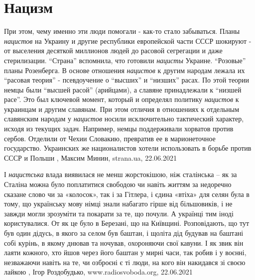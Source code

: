  
 
 
 
 
\chapter{Нацизм}
\label{sec:slova.nacizm}

При этом, чему именно эти люди помогали - как-то стало забываться. Планы
\emph{нацистов} на Украину и другие республики европейской части СССР шокируют - от
выселения десяткой миллионов людей до расовой сегрегации и даже стерилизации.
\enquote{Страна} вспомнила, что готовили \emph{нацисты} Украине.  \enquote{Розовые}
планы Розенберга.  В основе отношения \emph{нацистов} к другим народам лежала их
\enquote{расовая теория} - псевдоучение о \enquote{высших} и \enquote{низших}
расах. По этой теории немцы были \enquote{высшей расой} (арийцами), а славяне
принадлежали к \enquote{низшей расе}.  Это был ключевой момент, который и
определял политику \emph{нацистов} к украинцам и другим славянам.  При этом отличия в
отношениях к отдельным славянским народам у \emph{нацистов} носили исключительно
тактический характер, исходя из текущих задач. Например, немцы поддерживали
хорватов против сербов. Отделили от Чехии Словакию, превратив ее в
марионеточное государство. Украинских же националистов хотели использовать в
борьбе против СССР и Польши
, 
Максим Минин, strana.ua, 22.06.2021


І \emph{нацистська} влада виявилася не менш жорстокішою, ніж сталінська – як за
Сталіна можна було поплатитися свободою чи навіть життям за недоречно сказане
слово чи за «колосок», так і за Гітлера, і єдина «втіха» для селян була в тому,
що українську мову німці знали набагато гірше від більшовиків, і не завжди
могли зрозуміти та покарати за те, що почули. А українці тим іноді
користувалися. От як це було в Березані, що на Київщині.  Розповідають, що тут
був один дідусь, в якого за селом був баштан, і щоліта дід будував на баштані
собі курінь, в якому днював та ночував, охороняючи свої кавуни. І як звик він
лаяти кожного, хто йшов через його баштан у мирні часи, так робив і у воєнні,
незважаючи навіть на те, чи озброєні є ті люди, на кого він накидався зі своєю
лайкою
, 
Ігор Роздобудько, www.radiosvoboda.org, 22.06.2021

